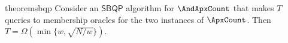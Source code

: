 \begin{restatable}{theorem}{sbqp}
\label{thm:sbqp}
Consider an $\mathsf{SBQP}$ algorithm for $\AndApxCount$ that makes $T$ queries to membership oracles for the two instances of $\ApxCount$. Then $T=\Omega\left(\min\bigl\{w,\sqrt{N/w}\bigr\}\right)$.
\end{restatable}

